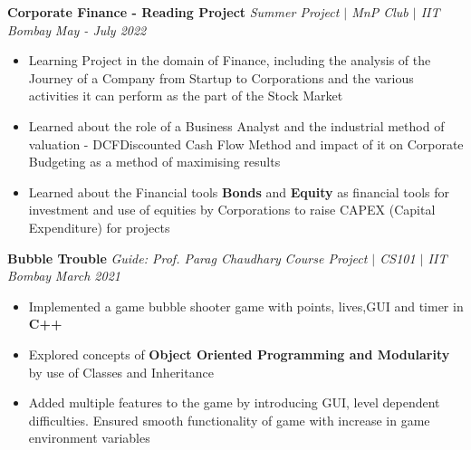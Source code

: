 \documentclass[a4paper,11pt]{article}
\newcommand{\xfilll}[2][1ex]{
\dimen0=#2\advance\dimen0 by #1
\leaders\hrule height \dimen0 depth -#1\hfill}
\begin{document}
\vspace{-4pt}
\textbf{\large Corporate Finance - Reading Project}
\textit{Summer Project $\vert$ MnP Club $\vert$ IIT Bombay}
\hfill\textit{\small May - July 2022}

\vspace{-1pt}
\vspace{-8pt}
\begin{itemize}[itemsep = -1.0mm, leftmargin = 0.2in]
\item Learning Project in the domain of Finance, including the analysis of the Journey of a Company from Startup to Corporations and the various activities it can perform as the part of the Stock Market
\item Learned about the role of a Business Analyst and the industrial method of valuation - DCF{Discounted Cash Flow Method} and impact of it on Corporate Budgeting as a method of maximising results
\item Learned about the Financial tools \textbf{Bonds} and \textbf{Equity} as financial tools for investment and use of equities by Corporations to raise CAPEX (Capital Expenditure) for projects   
\end{itemize}

\vspace{-4pt}

\textbf{\large Bubble Trouble}
\textit{\small Guide: Prof. Parag Chaudhary}
\textit{Course Project $\vert$ CS101 $\vert$ IIT Bombay}
\hfill\textit{\small March 2021}

\vspace{-1pt}
\vspace{-10pt}
\begin{itemize}[itemsep = -1.0mm, leftmargin = 0.2in]
\item Implemented a game bubble shooter game with points, lives,GUI and timer in \textbf{C++}
\item Explored concepts of \textbf{Object Oriented Programming and Modularity} by use of Classes and Inheritance
\item Added multiple features to the game by introducing GUI, level dependent difficulties. Ensured smooth functionality of game with increase in game environment variables 

\end{itemize}


\vspace{-20pt}
\end{document}
